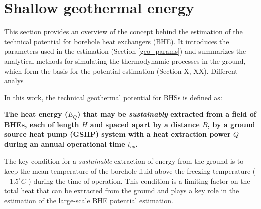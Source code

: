 \section{Shallow geothermal energy}
\label{geo_method}

This section provides an overview of the concept behind the estimation of the technical potential for borehole heat exchangers (BHE). It introduces the parameters used in the estimation (Section \ref{geo_params}) and summarizes the analytical methods for simulating the thermodynamic processes in the ground, which form the basis for the potential estimation (Section X, XX). Different analys

In this work, the technical geothermal potential for BHSs is defined as:

\textbf{The heat energy ($E_Q$) that may be \textit{sustainably} extracted from a field of BHEs, each of length $H$ and spaced apart by a distance $B$, by a ground source heat pump (GSHP) system with a heat extraction power $Q$ during an annual operational time $t_{op}$. }

The key condition for a \textit{sustainable} extraction of energy from the ground is to keep the mean temperature of the borehole fluid above the freezing temperature ($-1.5^\circ C$ \citep{wagner_erdsondenpotenzial_2014}) during the time of operation. This condition is a limiting factor on the total heat that can be extracted from the ground and plays a key role in the estimation of the large-scale BHE potential estimation.

